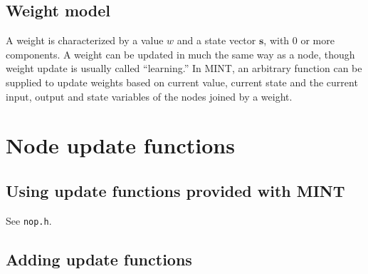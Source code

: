 \documentclass[12pt,letterpaper]{memoir}
\newcommand{\mint}{MINT\xspace}
\renewcommand{\vec}[1]{\ensuremath{\mathbf#1}\xspace}
\begin{document}
\subsection{Weight model}
\label{sec:weightmodel}
A weight is characterized by a value $w$ and a state vector $\vec s$,
with 0 or more components. A weight can be updated in much the same
way as a node, though weight update is usually called ``learning.''
In \mint, an arbitrary function can be supplied to update weights
based on current value, current state and the current input, output
and state variables of the nodes joined by a weight.

\section{Node update functions}
\label{sec:nupdate}

\subsection{Using update functions provided with \mint}
\label{sec:update-using}

See \lstinline{nop.h}.

\subsection{Adding update functions}
\label{sec:update-adding}
\end{document}
